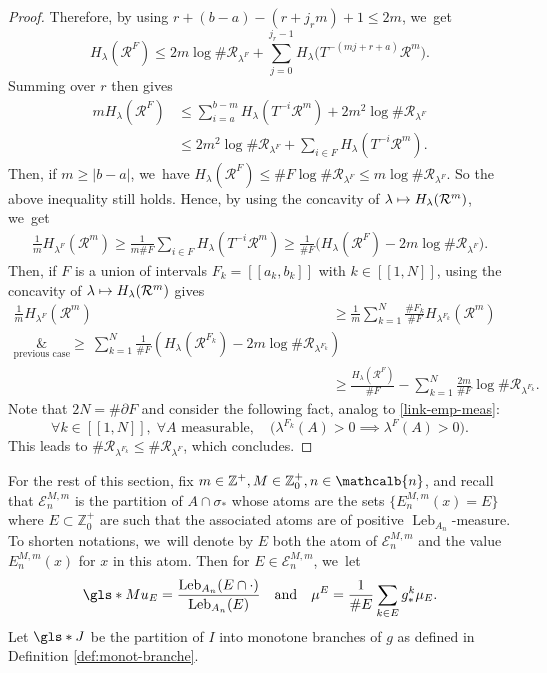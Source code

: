\documentclass[JEP,XML,SOM,Unicode,NoFloatCountersInSection,published]{cedram}
\newcommand\mto{\mathchoice{\longmapsto}{\mapsto}{\mapsto}{\mapsto}}
\DeclareMathOperator{\Leb}{Leb}
\newcommand{\mcbn}{{\mathcalb{n}}}
\theoremstyle{definition}
\newcommand{\bbZ}{{\mathbb{Z}}}
\begin{document}
\begin{proof}
Therefore, by using $r + (b-a) - (r+ j_r m) + 1 \leq 2m$, we~get
\[
H_{\lambda}(\mathcal{R}^F) \leq 2m \log \# \mathcal{R}_{\lambda^F} + \sum_{j=0}^{j_r - 1} H_{\lambda} \bigl (T^{-(mj + r+a)} \mathcal{R}^m \bigr).
\]
Summing over $r$ then gives
\begin{align*}
m H_{\lambda}(\mathcal{R}^F) &\leq \sum_{i=a}^{b-m} H_{\lambda}(T^{-i} \mathcal{R}^m) + 2m^2 \log \# \mathcal{R}_{\lambda^F}\\
&\leq 2m^2 \log \# \mathcal{R}_{\lambda^F} + \sum_{i \in F} H_{\lambda}(T^{-i} \mathcal{R}^m).
\end{align*}
Then, if $m \geq |b-a|$, we~have $H_{\lambda}(\mathcal{R}^F) \leq \# F \log \# \mathcal{R}_{\lambda^F} \leq m \log \# \mathcal{R}_{\lambda^F}$. So the above inequality still holds.
Hence, by using the concavity of $\lambda \mto H_{\lambda}(\mathcal{R}^m)$, we~get
\begin{align*}
\frac{1}{m} H_{\lambda^F}(\mathcal{R}^m) \geq \frac{1}{m \# F} \sum_{i \in F} H_{\lambda}(T^{-i} \mathcal{R}^m)
\geq \frac{1}{\# F} \bigl (H_{\lambda}(\mathcal{R}^F) - 2m \log \# \mathcal{R}_{\lambda^F} \bigr).
\end{align*}
Then, if $F$ is a union of intervals $F_k = [\![ a_k, b_k ]\!]$ with $k \in [\![ 1, N ]\!]$, using the concavity of $\lambda \mto H_{\lambda}(\mathcal{R}^m)$ gives
\begin{align*}
\frac{1}{m} H_{\lambda^F}(\mathcal{R}^m) &\geq \frac{1}{m} \sum_{k=1}^N \frac{\# F_k}{\# F} H_{\lambda^{F_k}}(\mathcal{R}^m)\\
\underset{\text{previous case}}&{\geq} \: \sum_{k=1}^N \frac{1}{\# F} \left (H_{\lambda}(\mathcal{R}^{F_k}) - 2m \log \# \mathcal{R}_{\lambda^{F_k}} \right)\\
&\geq \frac{H_{\lambda}(\mathcal{R}^F)}{\# F} - \sum_{k=1}^N \frac{2m}{\# F} \log \# \mathcal{R}_{\lambda^{F_k}}.
\end{align*}
Note that $2N = \# \partial F$ and consider the following fact, analog to \eqref{link-emp-meas}:
\[
\forall k \in [\![ 1, N ]\!],\; \forall A \text{ measurable},\quad \bigl (\lambda^{F_k}(A) > 0 \implies \lambda^F(A) > 0 \bigr).
\]
This leads to $\# \mathcal{R}_{\lambda^{F_k}} \leq \# \mathcal{R}_{\lambda^F}$, which concludes.
\end{proof}

For the rest of this section, fix $m \in \bbZ^+, M \in \bbZ_0^+, n \in \mcbn$, and recall that
$\mathcal{E}_n^{M,m}$ is the partition of $A \cap \sigma_*$ whose atoms are the sets $\{ E_n^{M,m}(x) = E \}$ where $E \subset \bbZ_0^+$ are such that the associated atoms are of positive $\Leb_{A_n}$-measure.
To shorten notations, we~will denote by $E$ both the atom of $\mathcal{E}_n^{M,m}$ and the value $E_n^{M,m}(x)$ for $x$ in this atom. Then for $E \in \mathcal{E}_n^{M,m}$, we~let
\[
\gls*{Mu_E} = \frac{\Leb_{A_n}(E \cap \cdot)}{\Leb_{A_n}(E)} \quad \text{and} \quad \mu^E = \frac{1}{\# E} \sum_{k \in E} g^k_* \mu_E.
\]
Let $\gls*{J}$ be the partition of $I$ into monotone branches of $g$ as defined in Definition \ref{def:monot-branche}.
\end{document}
